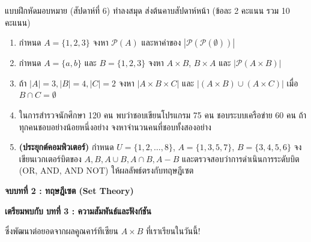 \begin{frame}{แบบฝึกหัดมอบหมาย (สัปดาห์ที่ 6)}
  ทำลงสมุด ส่งต้นคาบสัปดาห์หน้า (ข้อละ 2 คะแนน รวม 10 คะแนน)
  \begin{enumerate}\small
    \item กำหนด $A = \{1, 2, 3\}$ จงหา $\mathcal{P}(A)$ และหาค่าของ $|\mathcal{P}(\mathcal{P}(\emptyset))|$
    \item กำหนด $A = \{a, b\}$ และ $B = \{1, 2, 3\}$ จงหา $A \times B$, $B \times A$ และ $|\mathcal{P}(A \times B)|$
    \item ถ้า $|A| = 3, |B| = 4, |C| = 2$ จงหา $|A \times B \times C|$ และ $|(A \times B) \cup (A \times C)|$ เมื่อ $B \cap C = \emptyset$
    \item ในการสำรวจนักศึกษา 120 คน พบว่าชอบเขียนโปรแกรม 75 คน ชอบระบบเครือข่าย 60 คน ถ้าทุกคนชอบอย่างน้อยหนึ่งอย่าง จงหาจำนวนคนที่ชอบทั้งสองอย่าง
    \item \textbf{(ประยุกต์คอมพิวเตอร์)} กำหนด $U = \{1, 2, \ldots, 8\}$, $A = \{1, 3, 5, 7\}$, $B = \{3, 4, 5, 6\}$
          จงเขียนเวกเตอร์บิตของ $A, B, A \cup B, A \cap B, A - B$ และตรวจสอบว่าการดำเนินการระดับบิต (OR, AND, AND NOT) ให้ผลลัพธ์ตรงกับทฤษฎีเซต
  \end{enumerate}
\end{frame}

\begin{frame}[plain]
  \vfill
  \centering
  {\Large\color{navy}\textbf{จบบทที่ 2 : ทฤษฎีเซต (Set Theory)}}\par
  \vspace{0.8em}
  {\large\color{Tgreen}\textbf{เตรียมพบกับ บทที่ 3 : ความสัมพันธ์และฟังก์ชัน}}\par
  \vspace{0.4em}
  {\color{gray} ซึ่งพัฒนาต่อยอดจากผลคูณคาร์ทีเซียน $A \times B$ ที่เราเรียนในวันนี้!}
  \vfill
\end{frame}

